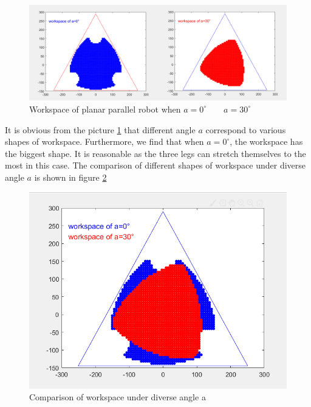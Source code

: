 \documentclass{article}
\begin{document}
\begin{figure}[htbp] 
\begin{center}
\includegraphics[width=\textwidth]{images/parallel_workspace2}
\caption{Workspace of planar parallel robot when $a=0^{\circ}\qquad a=30^{\circ}$}
\label{fig:parallel_workspace1}
\end{center}
\end{figure}

It is obvious from the picture \ref{fig:parallel_workspace1} that different angle $a$ correspond to various shapes of workspace. Furthermore, we find that when $a=0^{\circ}$, the workspace has the biggest shape. It is reasonable as the three legs can stretch themselves to the most in this case. The comparison of different shapes of workspace under diverse angle $a$ is shown in figure \ref{fig:parallel_workspace2}

\begin{figure}[htbp] 
\begin{center}
\includegraphics[width=\textwidth]{images/parallel_workspace}
\caption{Comparison of workspace under diverse angle a}
\label{fig:parallel_workspace2}
\end{center}
\end{figure}
\end{document}
